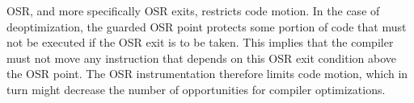 OSR, and more specifically OSR exits, restricts code motion. 
In the case of deoptimization, the guarded OSR point protects some portion of code that must not be executed if the OSR exit is to be taken.
This implies that the compiler must not move any instruction that depends on this OSR exit condition above the OSR point.
The OSR instrumentation therefore limits code motion, which in turn might decrease the number of opportunities for compiler optimizations.
